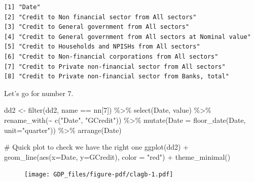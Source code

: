 \documentclass[
  letterpaper,
]{book}
\newenvironment{Shaded}{\begin{snugshade}}{\end{snugshade}}
\newcommand{\AttributeTok}[1]{\textcolor[rgb]{0.40,0.45,0.13}{#1}}
\newcommand{\CommentTok}[1]{\textcolor[rgb]{0.37,0.37,0.37}{#1}}
\newcommand{\DecValTok}[1]{\textcolor[rgb]{0.68,0.00,0.00}{#1}}
\newcommand{\FunctionTok}[1]{\textcolor[rgb]{0.28,0.35,0.67}{#1}}
\newcommand{\NormalTok}[1]{\textcolor[rgb]{0.00,0.23,0.31}{#1}}
\newcommand{\OtherTok}[1]{\textcolor[rgb]{0.00,0.23,0.31}{#1}}
\newcommand{\SpecialCharTok}[1]{\textcolor[rgb]{0.37,0.37,0.37}{#1}}
\newcommand{\StringTok}[1]{\textcolor[rgb]{0.13,0.47,0.30}{#1}}
\begin{document}
\begin{verbatim}
[1] "Date"                                                          
[2] "Credit to Non financial sector from All sectors"               
[3] "Credit to General government from All sectors"                 
[4] "Credit to General government from All sectors at Nominal value"
[5] "Credit to Households and NPISHs from All sectors"              
[6] "Credit to Non-financial corporations from All sectors"         
[7] "Credit to Private non-financial sector from All sectors"       
[8] "Credit to Private non-financial sector from Banks, total"      
\end{verbatim}

Let's go for number 7.

\begin{Shaded}
\begin{Highlighting}[]
\NormalTok{dd2 }\OtherTok{\textless{}{-}} \FunctionTok{filter}\NormalTok{(dd2, name }\SpecialCharTok{==}\NormalTok{ nn[}\DecValTok{7}\NormalTok{]) }\SpecialCharTok{\%\textgreater{}\%} 
  \FunctionTok{select}\NormalTok{(Date, value) }\SpecialCharTok{\%\textgreater{}\%} 
  \FunctionTok{rename\_with}\NormalTok{(}\SpecialCharTok{\textasciitilde{}} \FunctionTok{c}\NormalTok{(}\StringTok{"Date"}\NormalTok{, }\StringTok{"GCredit"}\NormalTok{)) }\SpecialCharTok{\%\textgreater{}\%} 
  \FunctionTok{mutate}\NormalTok{(}\AttributeTok{Date =} \FunctionTok{floor\_date}\NormalTok{(Date, }\AttributeTok{unit=}\StringTok{"quarter"}\NormalTok{)) }\SpecialCharTok{\%\textgreater{}\%} 
  \FunctionTok{arrange}\NormalTok{(Date)}

\CommentTok{\# Quick plot to check we have the right one}
\FunctionTok{ggplot}\NormalTok{(dd2) }\SpecialCharTok{+} 
  \FunctionTok{geom\_line}\NormalTok{(}\FunctionTok{aes}\NormalTok{(}\AttributeTok{x=}\NormalTok{Date, }\AttributeTok{y=}\NormalTok{GCredit), }\AttributeTok{color =} \StringTok{"red"}\NormalTok{) }\SpecialCharTok{+}
  \FunctionTok{theme\_minimal}\NormalTok{()}
\end{Highlighting}
\end{Shaded}

\begin{figure}[H]

{\centering \texttt{[image: GDP\_files/figure-pdf/clagb-1.pdf]}

}

\end{figure}
\end{document}
